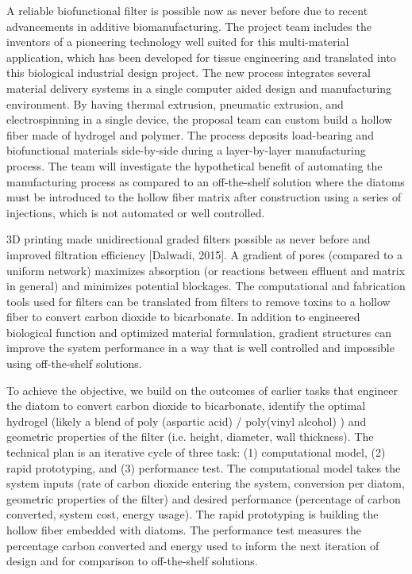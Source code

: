 \documentclass[a4paper,11pt]{article}
\begin{document}
A reliable biofunctional filter is possible now as never before due to recent advancements in additive biomanufacturing. The project team includes the inventors of a pioneering technology well suited for this multi-material application, which has been developed for tissue engineering and translated into this biological industrial design project. The new process integrates several material delivery systems in a single computer aided design and manufacturing environment. By having thermal extrusion, pneumatic extrusion, and electrospinning in a single device, the proposal team can custom build a hollow fiber made of hydrogel and polymer. The process deposits load-bearing and biofunctional materials side-by-side during a layer-by-layer manufacturing process. The team will investigate the hypothetical benefit of automating the manufacturing process as compared to an off-the-shelf solution where the diatoms must be introduced to the hollow fiber matrix after construction using a series of injections, which is not automated or well controlled.

3D printing made unidirectional graded filters possible as never before and improved filtration efficiency [Dalwadi, 2015]. A gradient of pores (compared to a uniform network) maximizes absorption (or reactions between effluent and matrix in general) and minimizes potential blockages. The computational and fabrication tools used for filters can be translated from filters to remove toxins to a hollow fiber to convert carbon dioxide to bicarbonate. In addition to engineered biological function and optimized material formulation, gradient structures can improve the system performance in a way that is well controlled and impossible using off-the-shelf solutions.

To achieve the objective, we build on the outcomes of earlier tasks that engineer the diatom to convert carbon dioxide to bicarbonate, identify the optimal hydrogel (likely a blend of poly (aspartic acid) / poly(vinyl alcohol) ) and geometric properties of the filter (i.e. height, diameter, wall thickness).
The technical plan is an iterative cycle of three task: (1) computational model,  (2) rapid prototyping, and (3) performance test. The computational model takes the system inputs (rate of carbon dioxide entering the system, conversion per diatom, geometric properties of the filter) and desired performance (percentage of carbon converted, system cost, energy usage). The rapid prototyping is building the hollow fiber embedded with diatoms. The performance test measures the percentage carbon converted and energy used to inform the next iteration of design and for comparison to off-the-shelf solutions.
\end{document}
